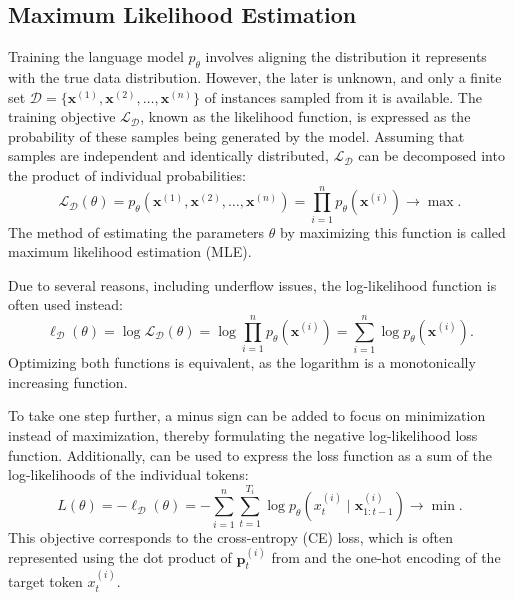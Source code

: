 \subsection{Maximum Likelihood Estimation}

Training the language model \(p_\theta\) involves aligning the distribution it represents with the true data distribution. However, the later is unknown, and only a finite set \(\mathcal{D} = \{\bm{x}^{(1)}, \bm{x}^{(2)}, \ldots, \bm{x}^{(n)}\}\) of instances sampled from it is available. The training objective \(\mathcal{L}_{\mathcal{D}}\), known as the likelihood function, is expressed as the probability of these samples being generated by the model. Assuming that samples are independent and identically distributed, \(\mathcal{L}_{\mathcal{D}}\) can be decomposed into the product of individual probabilities:
\begin{equation}
	\mathcal{L}_{\mathcal{D}}(\theta) = p_{\theta}(\bm{x}^{(1)}, \bm{x}^{(2)}, \ldots, \bm{x}^{(n)}) = \prod_{i=1}^{n} p_{\theta}(\bm{x}^{(i)}) \rightarrow \max.
\end{equation}
The method of estimating the parameters \(\theta\) by maximizing this function is called maximum likelihood estimation (MLE).

Due to several reasons, including underflow issues, the log-likelihood function is often used instead:
\begin{equation}
	\ell_{\mathcal{D}}(\theta) = \log \mathcal{L}_{\mathcal{D}}(\theta) = \log \prod_{i=1}^{n} p_{\theta}(\bm{x}^{(i)}) = \sum_{i=1}^{n} \log p_{\theta}(\bm{x}^{(i)}).
\end{equation}
Optimizing both functions is equivalent, as the logarithm is a monotonically increasing function.

To take one step further, a minus sign can be added to focus on minimization instead of maximization, thereby formulating the negative log-likelihood loss function. Additionally,  can be used to express the loss function as a sum of the log-likelihoods of the individual tokens:
\begin{equation}
	L(\theta) = -\ell_{\mathcal{D}}(\theta) = -\sum_{i=1}^{n} \sum_{t=1}^{T_i} \log p_{\theta}(x^{(i)}_t \mid \bm{x}^{(i)}_{1:t-1}) \rightarrow \min.
\end{equation}
This objective corresponds to the cross-entropy (CE) loss, which is often represented using the dot product of \(\mathbf{p}^{(i)}_t\) from  and the one-hot encoding of the target token \(x^{(i)}_t\).

